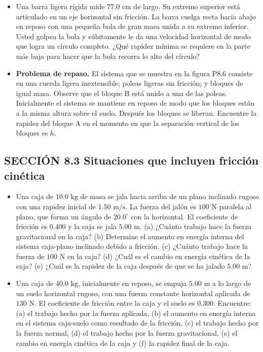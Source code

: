 \documentclass[11pt,a4paper]{article}
\begin{document}
\begin{itemize}
    \item[\textbf{5.}] Una barra ligera rígida mide $77.0 \text{ cm}$ de largo. Su extremo superior está articulado en un eje horizontal sin fricción. La barra cuelga recta hacia abajo en reposo con una pequeña bola de gran masa unida a su extremo inferior. Usted golpea la bola y súbitamente le da una velocidad horizontal de modo que logra un círculo completo. ¿Qué rapidez mínima se requiere en la parte más baja para hacer que la bola recorra lo alto del círculo?
    \vspace*{6cm}

    \item[\textbf{6.}] \textbf{Problema de repaso.} El sistema que se muestra en la figura P8.6 consiste en una cuerda ligera inextensible; poleas ligeras sin fricción; y bloques de igual masa. Observe que el bloque B está unido a una de las poleas. Inicialmente el sistema se mantiene en reposo de modo que los bloques están a la misma altura sobre el suelo. Después los bloques se liberan. Encuentre la rapidez del bloque A en el momento en que la separación vertical de los bloques es $h$.
    \vspace*{6cm}
\end{itemize}

\subsection*{SECCIÓN 8.3 Situaciones que incluyen fricción cinética}

\begin{itemize}
    \item[\textbf{7.}] Una caja de $10.0 \text{ kg}$ de masa se jala hacia arriba de un plano inclinado rugoso con una rapidez inicial de $1.50 \text{ m/s}$. La fuerza del jalón es $100 \text{ N}$ paralela al plano, que forma un ángulo de $20.0^\circ$ con la horizontal. El coeficiente de fricción es $0.400$ y la caja se jala $5.00 \text{ m}$. (a) ¿Cuánto trabajo hace la fuerza gravitacional en la caja? (b) Determine el aumento en energía interna del sistema caja-plano inclinado debido a fricción. (c) ¿Cuánto trabajo hace la fuerza de $100 \text{ N}$ en la caja? (d) ¿Cuál es el cambio en energía cinética de la caja? (e) ¿Cuál es la rapidez de la caja después de que se ha jalado $5.00 \text{ m}$?
    \vspace*{8cm}

    \item[\textbf{8.}] Una caja de $40.0 \text{ kg}$, inicialmente en reposo, se empuja $5.00 \text{ m}$ a lo largo de un suelo horizontal rugoso, con una fuerza constante horizontal aplicada de $130 \text{ N}$. El coeficiente de fricción entre la caja y el suelo es $0.300$. Encuentre: (a) el trabajo hecho por la fuerza aplicada, (b) el aumento en energía interna en el sistema caja-suelo como resultado de la fricción, (c) el trabajo hecho por la fuerza normal, (d) el trabajo hecho por la fuerza gravitacional, (e) el cambio en energía cinética de la caja y (f) la rapidez final de la caja.
    \vspace*{8cm}
\end{itemize}
\end{document}

